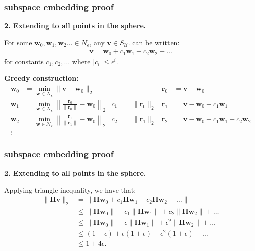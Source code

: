 \documentclass[compress]{beamer}
\newcommand{\bs}[1]{\boldsymbol{#1}}
\newcommand{\bv}[1]{\mathbf{#1}}
\begin{document}
\begin{frame}[t]
	\frametitle{subspace embedding proof}
	\begin{center}
		\alert{\textbf{2. Extending to all points in the sphere.}}
	\end{center}
	For some $\bv{w}_0, \bv{w}_1, \bv{w}_2 \ldots \in N_\epsilon$, any $\bv{v} \in S_{\mathcal{U}}$.  can be written:
	\begin{align*}
		\bv{v} = \bv{w}_0 + c_1\bv{w}_1+ c_2\bv{w}_2 + \ldots
	\end{align*}
	for constants $c_1, c_2,\ldots$ where $|c_i| \leq \epsilon^i$. 
	
	\textbf{Greedy construction:}
	\begin{align*}
	\bv{w}_0 &= \min_{\bv{w}\in \mathcal{N}_{\epsilon}} \|\bv{v} - \bv{w}_0\|_2 && & \bv{r}_0 &= \bv{v} - \bv{w}_0 \\
	\bv{w}_1 &= \min_{\bv{w}\in \mathcal{N}_{\epsilon}} \left\|\frac{\bv{r}_0}{\|\bv{r}_0\|} - \bv{w}_0\right\|_2 & c_1 &= \|\bv{r}_0\|_2 & \bv{r}_1 &= \bv{v} - \bv{w}_0 - c_1\bv{w}_1\\
	\bv{w}_2 &= \min_{\bv{w}\in \mathcal{N}_{\epsilon}} \left\|\frac{\bv{r}_1}{\|\bv{r}_1\|} - \bv{w}_0\right\|_2 & c_2 &= \|\bv{r}_1\|_2 & \bv{r}_2 &= \bv{v} - \bv{w}_0 - c_1\bv{w}_1 - c_2\bv{w}_2\\
	\vdots
	\end{align*}
\end{frame}

\begin{frame}[t]
	\frametitle{subspace embedding proof}
	\begin{center}
		\alert{\textbf{2. Extending to all points in the sphere.}}
	\end{center}
	
	Applying triangle inequality, we have that:
	\begin{align*}
		\|\bs{\Pi} \bv{v}\|_2 &= 	\|\bs{\Pi}\bv{w}_0 + c_1\bs{\Pi}\bv{w}_1+ c_2\bs{\Pi}\bv{w}_2 + \ldots\| \\ 
		&\leq \|\bs{\Pi}\bv{w}_0 \| + c_1\|\bs{\Pi}\bv{w}_1 \|+ c_2 \|\bs{\Pi}\bv{w}_2 \| + \ldots \\
		&\leq \|\bs{\Pi}\bv{w}_0 \| + \epsilon\|\bs{\Pi}\bv{w}_1 \|+ \epsilon^2 \|\bs{\Pi}\bv{w}_2 \| + \ldots \\
		&\leq (1+\epsilon)+ \epsilon(1+\epsilon)+ \epsilon^2 (1+\epsilon) + \ldots\\  &\leq 1+4\epsilon.
	\end{align*}
\end{frame}
\end{document}

